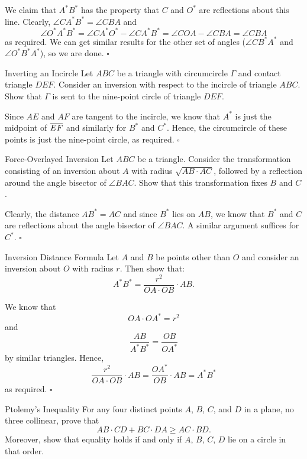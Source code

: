 \documentclass{article}
\begin{document}
We claim that $A^*B^*$ has the property that $C$ and $O^*$ are reflections about this line. Clearly, $\angle CA^*B^* = \angle CBA$ and \[\angle O^*A^*B^* = \angle CA^*O^* - \angle CA^*B^* = \angle COA - \angle CBA = \angle CBA\] as required. We can get similar results for the other set of angles ($\angle CB^*A^*$ and $\angle O^*B^*A^*$), so we are done. $\square$

\begin{problem}[8.11]{Inverting an Incircle}
Let $ABC$ be a triangle with circumcircle $\Gamma$ and contact triangle $DEF$. Consider an inversion with respect to the incircle of triangle $ABC$. Show that $\Gamma$ is sent to the nine-point circle of triangle $DEF$.
\end{problem}

Since $AE$ and $AF$ are tangent to the incircle, we know that $A^*$ is just the midpoint of $\overline{EF}$ and similarly for $B^*$ and $C^*$. Hence, the circumcircle of these points is just the nine-point circle, as required. $\square$

\begin{problem}[8.17]{Force-Overlayed Inversion}
Let $ABC$ be a triangle. Consider the transformation consisting of an inversion about $A$ with radius $\sqrt{AB \cdot AC}$, followed by a reflection around the angle bisector of $\angle BAC$. Show that this transformation fixes $B$ and $C$.
\end{problem}

Clearly, the distance $AB^* = AC$ and since $B^*$ lies on $AB$, we know that $B^*$ and $C$ are reflections about the angle bisector of $\angle BAC$. A similar argument suffices for $C^*$. $\square$

\begin{problem}[8.19]{Inversion Distance Formula}
Let $A$ and $B$ be points other than $O$ and consider an inversion about $O$ with radius $r$. Then show that: \[A^*B^* = \dfrac{r^2}{OA \cdot OB} \cdot AB.\]
\end{problem}

We know that \[OA\cdot OA^* = r^2\] and \[\dfrac{AB}{A^*B^*} = \dfrac{OB}{OA^*}\] by similar triangles. Hence, \[\dfrac{r^2}{OA \cdot OB} \cdot AB = \dfrac{OA^*}{OB} \cdot AB = A^*B^*\] as required. $\square$

\begin{problem}[8.20]{Ptolemy's Inequality}
For any four distinct points $A$, $B$, $C$, and $D$ in a plane, no three collinear, prove that \[AB \cdot CD + BC \cdot DA \ge AC \cdot BD.\] Moreover, show that equality holds if and only if $A$, $B$, $C$, $D$ lie on a circle in that order.
\end{problem}
\end{document}
